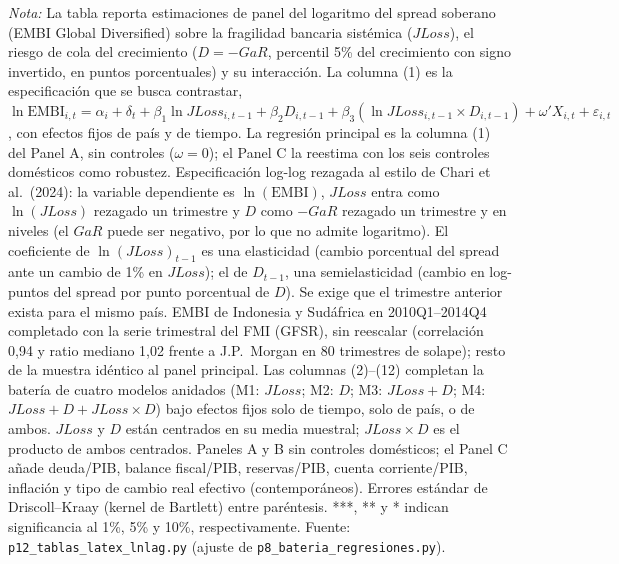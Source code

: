 \documentclass[11pt]{article}
\begin{document}
\begin{landscape}
\begin{table}
\par\smallskip\parbox{\linewidth}{\scriptsize \textit{Nota:} La tabla reporta estimaciones de panel del logaritmo del spread soberano (EMBI Global Diversified) sobre la fragilidad bancaria sistémica ($JLoss$), el riesgo de cola del crecimiento ($D=-GaR$, percentil 5\% del crecimiento con signo invertido, en puntos porcentuales) y su interacción. La columna (1) es la especificación que se busca contrastar, $\ln\mathrm{EMBI}_{i,t}=\alpha_i+\delta_t+\beta_1\ln JLoss_{i,t-1}+\beta_2 D_{i,t-1}+\beta_3(\ln JLoss_{i,t-1}\times D_{i,t-1})+\omega'X_{i,t}+\varepsilon_{i,t}$, con efectos fijos de país y de tiempo. La regresión principal es la columna (1) del Panel A, sin controles ($\omega=0$); el Panel C la reestima con los seis controles domésticos como robustez. Especificación log-log rezagada al estilo de Chari et al.\ (2024): la variable dependiente es $\ln(\mathrm{EMBI})$, $JLoss$ entra como $\ln(JLoss)$ rezagado un trimestre y $D$ como $-GaR$ rezagado un trimestre y en niveles (el $GaR$ puede ser negativo, por lo que no admite logaritmo). El coeficiente de $\ln(JLoss)_{t-1}$ es una elasticidad (cambio porcentual del spread ante un cambio de 1\% en $JLoss$); el de $D_{t-1}$, una semielasticidad (cambio en log-puntos del spread por punto porcentual de $D$). Se exige que el trimestre anterior exista para el mismo país. EMBI de Indonesia y Sudáfrica en 2010Q1--2014Q4 completado con la serie trimestral del FMI (GFSR), sin reescalar (correlación 0,94 y ratio mediano 1,02 frente a J.P.\ Morgan en 80 trimestres de solape); resto de la muestra idéntico al panel principal. Las columnas (2)--(12) completan la batería de cuatro modelos anidados (M1: $JLoss$; M2: $D$; M3: $JLoss+D$; M4: $JLoss+D+JLoss\times D$) bajo efectos fijos solo de tiempo, solo de país, o de ambos. $JLoss$ y $D$ están centrados en su media muestral; $JLoss\times D$ es el producto de ambos centrados. Paneles A y B sin controles domésticos; el Panel C añade deuda/PIB, balance fiscal/PIB, reservas/PIB, cuenta corriente/PIB, inflación y tipo de cambio real efectivo (contemporáneos). Errores estándar de Driscoll--Kraay (kernel de Bartlett) entre paréntesis. ***, ** y * indican significancia al 1\%, 5\% y 10\%, respectivamente. Fuente: \texttt{p12\_tablas\_latex\_lnlag.py} (ajuste de \texttt{p8\_bateria\_regresiones.py}).}
\end{table}
\end{landscape}

\clearpage
\end{document}
